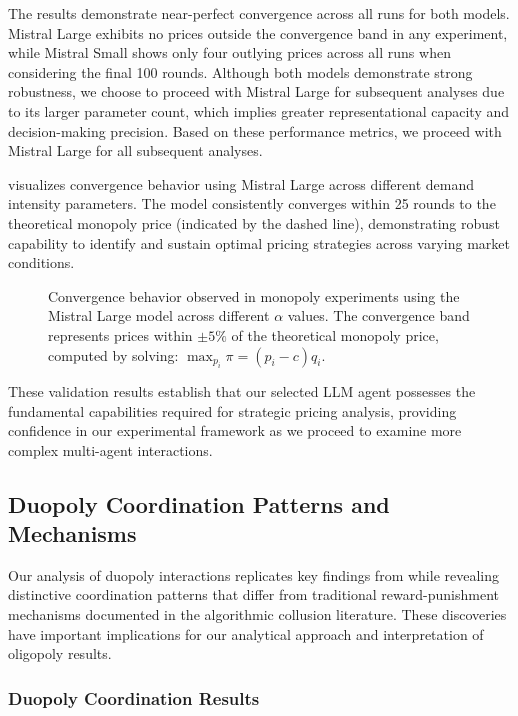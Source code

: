 The results demonstrate near-perfect convergence across all runs for both models. Mistral Large exhibits no prices outside the convergence band in any experiment, while Mistral Small shows only four outlying prices across all runs when considering the final 100 rounds. Although both models demonstrate strong robustness, we choose to proceed with Mistral Large for subsequent analyses due to its larger parameter count, which implies greater representational capacity and decision-making precision. Based on these performance metrics, we proceed with Mistral Large for all subsequent analyses.

 visualizes convergence behavior using Mistral Large across different demand intensity parameters. The model consistently converges within 25 rounds to the theoretical monopoly price (indicated by the dashed line), demonstrating robust capability to identify and sustain optimal pricing strategies across varying market conditions.

\begin{figure}[htpb!]
    \centering
    
    \caption{Convergence behavior observed in monopoly experiments using the Mistral Large model across different $\alpha$ values. The convergence band represents prices within $\pm 5\%$ of the theoretical monopoly price, computed by solving: $\max_{p_i} \pi = (p_i - c) q_i$.}
    \label{fig:monopoly_convergence}
\end{figure}

These validation results establish that our selected LLM agent possesses the fundamental capabilities required for strategic pricing analysis, providing confidence in our experimental framework as we proceed to examine more complex multi-agent interactions.

\subsection{Duopoly Coordination Patterns and Mechanisms}

Our analysis of duopoly interactions replicates key findings from \textcite{fish_algorithmic_2025} while revealing distinctive coordination patterns that differ from traditional reward-punishment mechanisms documented in the algorithmic collusion literature. These discoveries have important implications for our analytical approach and interpretation of oligopoly results.

\subsubsection*{Duopoly Coordination Results}

